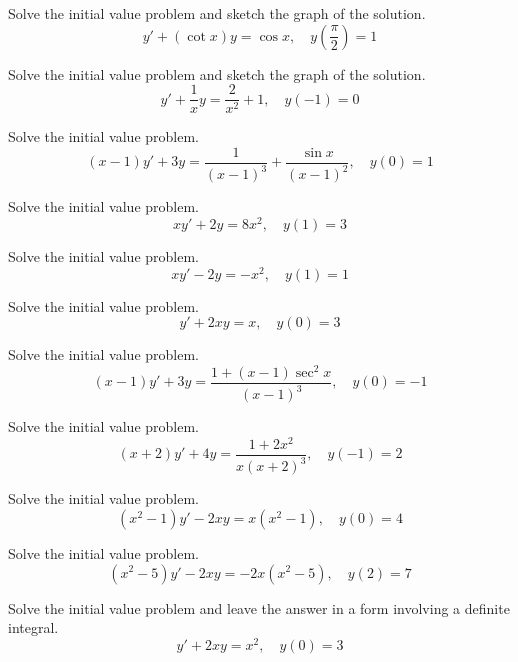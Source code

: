 \documentclass{ximera}
\begin{document}
\begin{problem}\label{exer:2.1.28} Solve the
initial value problem and sketch the graph of the solution.
$$y'+ (\cot x)y=\cos x,\quad
y\left(\frac{\pi}{2}\right)=1$$
\end{problem}

\begin{problem}\label{exer:2.1.29} Solve the
initial value problem and sketch the graph of the solution.
$$y'+\frac{1}{x}y=\frac{2}{x^2}+1,\quad y(-1)=0$$
\end{problem}

\begin{problem}\label{exer:2.1.30} Solve the initial value problem.
$$(x-1)y'+3y=\frac{1}{(x-1)^3} +
\frac{\sin x}{(x-1)^2},\quad y(0)=1$$
\end{problem}

\begin{problem}\label{exer:2.1.31} Solve the initial value problem.
$$xy'+2y=8x^2,\quad y(1)=3$$
\end{problem}

\begin{problem}\label{exer:2.1.32} Solve the initial value problem.
$$xy'-2y=-x^2,\quad y(1)=1$$
\end{problem}

\begin{problem}\label{exer:2.1.33} Solve the initial value problem.
$$y'+2xy=x,\quad y(0)=3$$
\end{problem}

\begin{problem}\label{exer:2.1.34} Solve the initial value problem.
$$(x-1)y'+3y=\frac{1+(x-1)\sec^2x}{(x-1)^3},\quad y(0)=-1$$
\end{problem}

\begin{problem}\label{exer:2.1.35} Solve the initial value problem.
$$(x+2)y'+4y=\frac{1+2x^2}{x(x+2)^3},\quad y(-1)=2$$
\end{problem}

\begin{problem}\label{exer:2.1.36} Solve the initial value problem.
$$(x^2-1)y'-2xy=x(x^2-1),\quad y(0)=4$$
\end{problem}

\begin{problem}\label{exer:2.1.37} Solve the initial value problem.
$$(x^2-5)y'-2xy=-2x(x^2-5),\quad y(2)=7$$
\end{problem}

\begin{problem}\label{exer:2.1.38} Solve the initial value problem and leave the answer in a form involving a definite integral.
$$y'+2xy=x^2,\quad y(0)=3$$
\end{problem}
\end{document}
